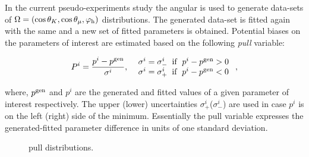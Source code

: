 In the current pseudo-experiments study the angular \pdf is used to generate data-sets of $\Omega = (\cos\theta_{K},\cos\theta_{\mu},\varphi_{\rm h})$
distributions. The generated data-set is fitted again with the same \pdf and a new set of fitted parameters is obtained. Potential
biases on the parameters of interest are estimated based on the following {\it pull} variable:

\begin{equation}
P^i = \frac{p^i - p^{\rm gen}}{ \sigma^i },\;\;\left.
  \begin{array}{ll}
    \sigma^i = \sigma^i_- \;\;{\rm if}\;\; p^i - p^{\rm gen} > 0   \\
    \sigma^i = \sigma^i_+ \;\;{\rm if}\;\; p^i - p^{\rm gen} < 0
  \end{array} \right. ,
\label{pull_def}
\end{equation}

\noindent where, $p^{\rm gen}$ and $p^i$ are the generated and fitted values of a given parameter of interest
respectively. The upper (lower) uncertainties $\sigma^i_+$($\sigma^i_-$) are used in case $p^i$ is on the left (right) side of the minimum.
Essentially the pull variable expresses the generated-fitted parameter difference in units of one standard deviation.

\begin{figure}[h]
  \centering
  \begin{subfigure}{0.5\textwidth}
    \raggedright
    \scalebox{0.56}{}
    \caption{}
    \label{pull_f0}
  \end{subfigure}%
  \hfill%
  \begin{subfigure}{0.5\textwidth}
    \raggedleft
    \scalebox{0.56}{}
    \caption{}
    \label{pull_fpar}
  \end{subfigure}
  \begin{subfigure}{0.5\textwidth}
    \raggedright
    \scalebox{0.56}{}
    \caption{}
    \label{pull_AparPhase}
  \end{subfigure}%
  \hfill%
  \begin{subfigure}{0.5\textwidth}
    \raggedleft
    \scalebox{0.56}{}
    \caption{}
    \label{pull_AperpPhase}
  \end{subfigure}
\caption{\pwave pull distributions.}
\label{pull_pwave}
\end{figure}

